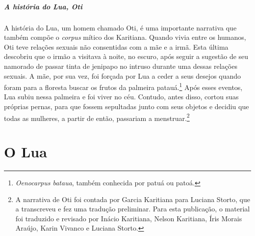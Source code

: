 \paragraph{A história do Lua, Oti} A história do Lua, um homem chamado Oti, é uma importante narrativa que também compõe o \textit{corpus} mítico dos Karitiana. Quando vivia entre
os humanos, Oti teve relações sexuais não consentidas com a mãe e a
irmã. Esta última descobriu que o irmão a visitava à noite, no escuro,
após seguir a sugestão de seu namorado de passar tinta de jenipapo no
intruso durante uma dessas relações sexuais. A mãe, por sua vez, foi
forçada por Lua a ceder a seus desejos quando foram para a floresta
buscar os frutos da palmeira patauá.\footnote{\textit{Oenocarpus bataua}, também 
conhecida por patuá ou patoá.} Após esses eventos, Lua subiu
nessa palmeira e foi viver no céu. Contudo, antes disso, cortou suas
próprias pernas, para que fossem sepultadas junto com seus objetos e
decidiu que todas as mulheres, a partir de então, passariam a menstruar.\footnote{A narrativa de Oti foi contada por Garcia Karitiana para Luciana Storto,
que a transcreveu e fez uma tradução preliminar. Para esta publicação, o
material foi traduzido e revisado por Inácio Karitiana, Nelson
Karitiana, Íris Morais Araújo, Karin Vivanco e Luciana Storto.}
\vspace*{\fill}


\chapter{O Lua}

